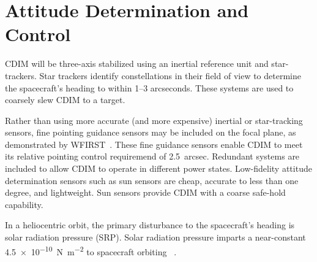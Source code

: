 \documentclass{ws-jai}
\begin{document}



\section{Attitude Determination and Control}
\label{sec:adcs}
CDIM will be three-axis stabilized using an inertial reference unit and star-trackers.
Star trackers identify constellations in their field of view to determine the spacecraft's heading to within 1--3 arcseconds.
These systems are used to coarsely slew CDIM to a target.

Rather than using more accurate (and more expensive) inertial or star-tracking sensors, fine pointing guidance sensors may be included on the focal plane, as demonstrated by WFIRST~\cite{wfirstFinal2012}.
These fine guidance sensors enable CDIM to meet its relative pointing control requiremend of \SI{2.5}{arcsec}.
Redundant systems are included to allow CDIM to operate in different power states.
Low-fidelity attitude determination sensors such as sun sensors are cheap, accurate to less than one degree, and lightweight.
Sun sensors provide CDIM with a coarse safe-hold capability.

In a heliocentric orbit, the primary disturbance to the spacecraft's heading is solar radiation pressure (SRP).
Solar radiation pressure imparts a near-constant \SI{4.5e-10}{\newton\per\meter\squared} to spacecraft orbiting \Ltwo~\cite{evans2002natural}.
\end{document}

